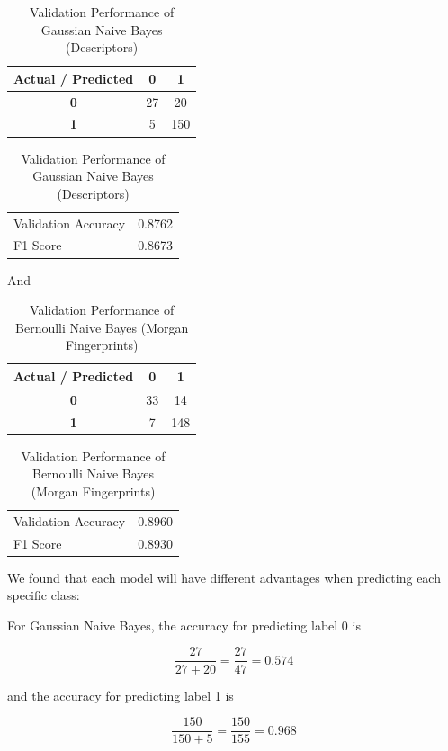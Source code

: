 \documentclass{article}
\begin{document}
\begin{table}[h]
\centering
\caption{Validation Performance of Gaussian Naive Bayes (Descriptors)}
\begin{tabular}{c|cc}
\hline
\textbf{Actual / Predicted} & \textbf{0} & \textbf{1} \\
\hline
\textbf{0} & 27 & 20 \\
\textbf{1} & 5 & 150 \\
\hline
\end{tabular}

\vspace{0.3cm}

\begin{tabular}{lc}
\hline
Validation Accuracy & 0.8762 \\
F1 Score & 0.8673 \\
\hline
\end{tabular}

\end{table}

And

\begin{table}[h]
\centering
\caption{Validation Performance of Bernoulli Naive Bayes (Morgan Fingerprints)}
\begin{tabular}{c|cc}
\hline
\textbf{Actual / Predicted} & \textbf{0} & \textbf{1} \\
\hline
\textbf{0} & 33 & 14 \\
\textbf{1} & 7 & 148 \\
\hline
\end{tabular}

\vspace{0.3cm}

\begin{tabular}{lc}
\hline
Validation Accuracy & 0.8960 \\
F1 Score & 0.8930 \\
\hline
\end{tabular}

\end{table}

We found that each model will have different advantages when predicting each specific class:

For Gaussian Naive Bayes, the accuracy for predicting label 0 is

\[
\frac{27}{27+20} = \frac{27}{47} = 0.574
\]

and the accuracy for predicting label 1 is

\[
\frac{150}{150+5} = \frac{150}{155} = 0.968
\]
\end{document}
